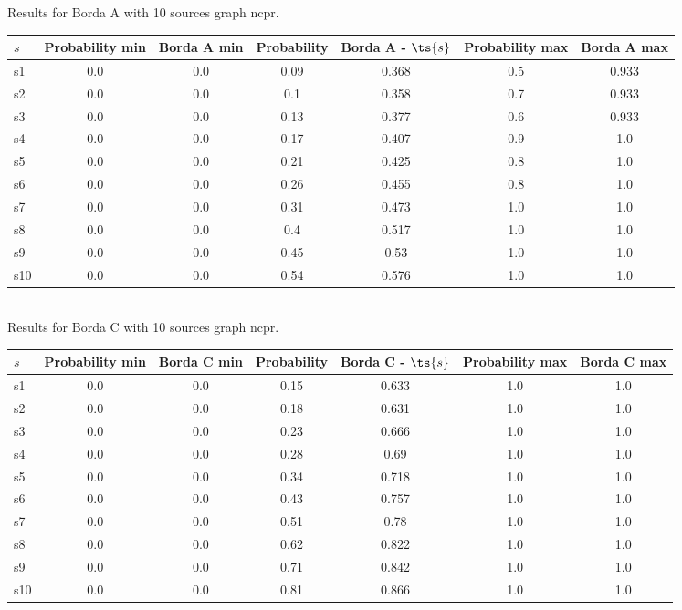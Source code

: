 \documentclass{article}
\begin{document}
\noindent Results for Borda A with 10 sources graph ncpr.

\noindent\begin{tabular}{|l|c|c|c|c|c|c|}
\hline
$s$& Probability min & Borda A min & Probability & Borda A - $\ts{s}$ & Probability max & Borda A max\\
\hline
s1 &0.0 & 0.0 & 0.09 & 0.368 & 0.5 & 0.933\\
\hline
s2 &0.0 & 0.0 & 0.1 & 0.358 & 0.7 & 0.933\\
\hline
s3 &0.0 & 0.0 & 0.13 & 0.377 & 0.6 & 0.933\\
\hline
s4 &0.0 & 0.0 & 0.17 & 0.407 & 0.9 & 1.0\\
\hline
s5 &0.0 & 0.0 & 0.21 & 0.425 & 0.8 & 1.0\\
\hline
s6 &0.0 & 0.0 & 0.26 & 0.455 & 0.8 & 1.0\\
\hline
s7 &0.0 & 0.0 & 0.31 & 0.473 & 1.0 & 1.0\\
\hline
s8 &0.0 & 0.0 & 0.4 & 0.517 & 1.0 & 1.0\\
\hline
s9 &0.0 & 0.0 & 0.45 & 0.53 & 1.0 & 1.0\\
\hline
s10 &0.0 & 0.0 & 0.54 & 0.576 & 1.0 & 1.0\\
\hline
\end{tabular}\\

\noindent Results for Borda C with 10 sources graph ncpr.

\noindent\begin{tabular}{|l|c|c|c|c|c|c|}
\hline
$s$& Probability min & Borda C min & Probability & Borda C - $\ts{s}$ & Probability max & Borda C max\\
\hline
s1 &0.0 & 0.0 & 0.15 & 0.633 & 1.0 & 1.0\\
\hline
s2 &0.0 & 0.0 & 0.18 & 0.631 & 1.0 & 1.0\\
\hline
s3 &0.0 & 0.0 & 0.23 & 0.666 & 1.0 & 1.0\\
\hline
s4 &0.0 & 0.0 & 0.28 & 0.69 & 1.0 & 1.0\\
\hline
s5 &0.0 & 0.0 & 0.34 & 0.718 & 1.0 & 1.0\\
\hline
s6 &0.0 & 0.0 & 0.43 & 0.757 & 1.0 & 1.0\\
\hline
s7 &0.0 & 0.0 & 0.51 & 0.78 & 1.0 & 1.0\\
\hline
s8 &0.0 & 0.0 & 0.62 & 0.822 & 1.0 & 1.0\\
\hline
s9 &0.0 & 0.0 & 0.71 & 0.842 & 1.0 & 1.0\\
\hline
s10 &0.0 & 0.0 & 0.81 & 0.866 & 1.0 & 1.0\\
\hline
\end{tabular}\\
\end{document}
